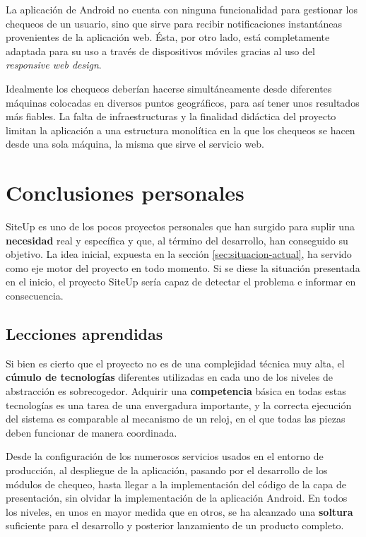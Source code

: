 La aplicación de Android no cuenta con ninguna funcionalidad para gestionar los
chequeos de un usuario, sino que sirve para recibir notificaciones instantáneas
provenientes de la aplicación web. Ésta, por otro lado, está completamente
adaptada para su uso a través de dispositivos móviles gracias al uso del
\textit{responsive web design}.

Idealmente los chequeos deberían hacerse simultáneamente desde diferentes
máquinas colocadas en diversos puntos geográficos, para así tener unos
resultados más fiables. La falta de infraestructuras y la finalidad didáctica
del proyecto limitan la aplicación a una estructura monolítica en la que los
chequeos se hacen desde una sola máquina, la misma que sirve el servicio web.

\section{Conclusiones personales}

SiteUp es uno de los pocos proyectos personales que han surgido para suplir una
\textbf{necesidad} real y específica y que, al término del desarrollo, han
conseguido su objetivo. La idea inicial, expuesta en la sección
\ref{sec:situacion-actual}, ha servido como eje motor del proyecto en todo
momento. Si se diese la situación presentada en el inicio, el proyecto SiteUp
sería capaz de detectar el problema e informar en consecuencia. 

\subsection{Lecciones aprendidas}

Si bien es cierto que el proyecto no es de una complejidad técnica muy alta, el
\textbf{cúmulo de tecnologías} diferentes utilizadas en cada uno de los niveles
de abstracción es sobrecogedor. Adquirir una \textbf{competencia} básica en
todas estas tecnologías es una tarea de una envergadura importante, y la
correcta ejecución del sistema es comparable al mecanismo de un reloj, en el que
todas las piezas deben funcionar de manera coordinada.

Desde la configuración de los numerosos servicios usados en el entorno de
producción, al despliegue de la aplicación, pasando por el desarrollo de los
módulos de chequeo, hasta llegar a la implementación del código de la capa de
presentación, sin olvidar la implementación de la aplicación Android. En todos
los niveles, en unos en mayor medida que en otros, se ha alcanzado una
\textbf{soltura} suficiente para el desarrollo y posterior lanzamiento de un
producto completo.

